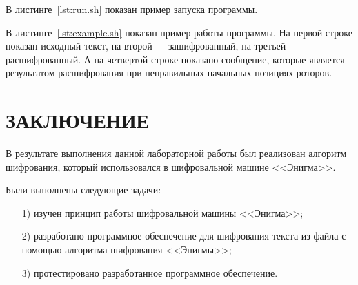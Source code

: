 \documentclass{bmstu}
\begin{document}

В листинге~\ref{lst:run.sh} показан пример запуска программы.


В листинге~\ref{lst:example.sh} показан пример работы программы. 
На первой строке показан исходный текст, на второй --- зашифрованный, 
на третьей --- расшифрованный. 
А на четвертой строке показано сообщение, которые является результатом расшифрования при неправильных начальных позициях роторов.


{\centering \chapter*{ЗАКЛЮЧЕНИЕ}}

В результате выполнения данной лабораторной работы был реализован алгоритм шифрования, который использовался в шифровальной машине <<Энигма>>.

Были выполнены следующие задачи:
\begin{enumerate}
\item[1)] изучен принцип работы шифровальной машины <<Энигма>>;
\item[2)] разработано программное обеспечение для шифрования текста из файла с помощью алгоритма шифрования <<Энигмы>>;
\item[3)] протестировано разработанное программное обеспечение.
\end{enumerate}

{\centering \printbibliography[title=СПИСОК ИСПОЛЬЗОВАННЫХ ИСТОЧНИКОВ,heading=bibintoc]}
\end{document}
